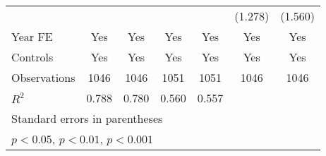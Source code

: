 \begin{table}[htbp]
\begin{tabular}{l*{6}{c}}
                &                  &                  &                  &                  &  (1.278)         &  (1.560)         \\
\addlinespace
Year FE         &      Yes         &      Yes         &      Yes         &      Yes         &      Yes         &      Yes         \\
\addlinespace
Controls        &      Yes         &      Yes         &      Yes         &      Yes         &      Yes         &      Yes         \\
\midrule
Observations    &     1046         &     1046         &     1051         &     1051         &     1046         &     1046         \\
\(R^{2}\)       &    0.788         &    0.780         &    0.560         &    0.557         &                  &                  \\
\bottomrule
\multicolumn{7}{l}{\footnotesize Standard errors in parentheses}\\
\multicolumn{7}{l}{\footnotesize \sym{*} \(p<0.05\), \sym{**} \(p<0.01\), \sym{***} \(p<0.001\)}\\
\end{tabular}
\end{table}
